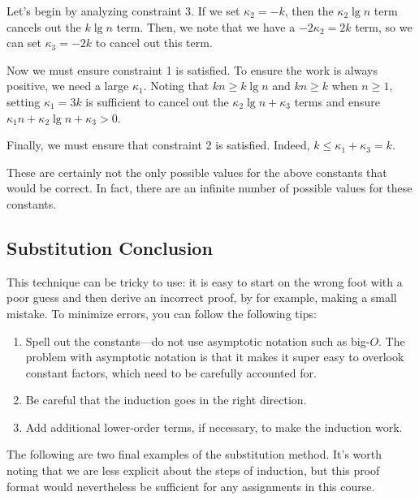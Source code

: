 \begin{flex}
\begin{gram}
Let's begin by analyzing constraint 3. If we set $\kappa_2 = -k$, then the $\kappa_2 \lg n$ term cancels out the
$k \lg n$ term. Then, we note that we have a $-2 \kappa_2 = 2k$ term, so we can
set $\kappa_3 = -2k$ to cancel out this term.

Now we must ensure constraint 1 is satisfied. To ensure the work is always
positive, we need a large $\kappa_1$. Noting that $kn \geq k \lg n$ and $kn \geq k$
when $n \geq 1$, setting $\kappa_1 = 3k$ is sufficient to cancel out the
$\kappa_2 \lg n + \kappa_3$ terms and ensure $\kappa_1 n + \kappa_2 \lg n + \kappa_3 > 0$.

Finally, we must ensure that constraint 2 is satisfied. Indeed,
$k \leq \kappa_1 + \kappa_3 = k$.
\end{gram}

\begin{note}
These are certainly not the only possible values for the above constants that
would be correct. In fact, there are an infinite number of possible values
for these constants.
\end{note}
\end{flex}

\subsection{Substitution Conclusion}
\begin{important}
This technique can be tricky to use: it is easy to start on the wrong
foot with a poor guess and then derive an incorrect proof, by for example,
making a small mistake.
%
To minimize errors, you can follow the following tips:
\begin{enumerate}
\item Spell out the constants---do not use asymptotic notation such as
  big-$O$.  The problem with asymptotic notation is that it makes it
  super easy to overlook constant factors, which need to be carefully
  accounted for.

\item Be careful that the induction goes in the right direction.

\item Add additional lower-order terms, if necessary, to make the
  induction work.
\end{enumerate}
\end{important}

\begin{gram}
The following are two final examples of the substitution method. It's worth noting that
we are less explicit about the steps of induction, but this proof format
would nevertheless be sufficient for any assignments in this course.
\end{gram}

